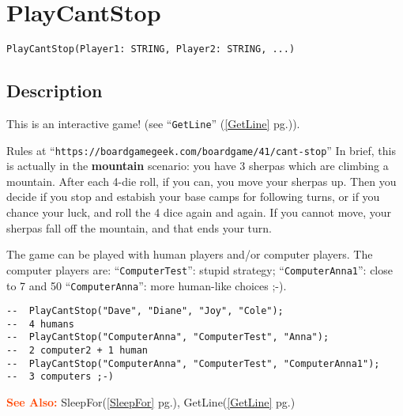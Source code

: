 \documentclass[a4paper]{mybook}
\newenvironment{command}{}{} %
\newcommand\SeeAlso{\par\textcolor{OrangeRed}{\textbf{\large See Also: }}}
\begin{document}
\section{PlayCantStop}
\label{PlayCantStop}
\begin{command} %


\begin{Verbatim}[label=syntax, rulecolor=\color{MidnightBlue},
frame=single]
PlayCantStop(Player1: STRING, Player2: STRING, ...)
\end{Verbatim}


\subsection*{Description}

This is an interactive game!  (see ``\verb&GetLine&'' (\ref{GetLine} pg.\pageref{GetLine})).
\par 
Rules at ``\verb&https://boardgamegeek.com/boardgame/41/cant-stop&''
In brief, this is actually in the \textbf{mountain} scenario:
you have 3 sherpas which are climbing a mountain.
After each 4-die roll, if you can, you move your sherpas up.
Then you decide if you stop and estabish your base camps for following turns, 
or if you chance your luck, and roll the 4 dice again and again.
If you cannot move, your sherpas fall off the mountain, and that ends
your turn.
\par 
The game can be played with human players and/or computer players.
The computer players are:
``\verb&ComputerTest&'': stupid strategy;
``\verb&ComputerAnna1&'': close to 7 and 50%
``\verb&ComputerAnna&'': more human-like choices ;-).
\begin{Verbatim}[label=example, rulecolor=\color{PineGreen}, frame=single]
--  PlayCantStop("Dave", "Diane", "Joy", "Cole");
--  4 humans
--  PlayCantStop("ComputerAnna", "ComputerTest", "Anna");
--  2 computer2 + 1 human
--  PlayCantStop("ComputerAnna", "ComputerTest", "ComputerAnna1");
--  3 computers ;-)
\end{Verbatim}


\SeeAlso %
  SleepFor(\ref{SleepFor} pg.\pageref{SleepFor}), 
    GetLine(\ref{GetLine} pg.\pageref{GetLine})
\end{command} %
\end{document}
